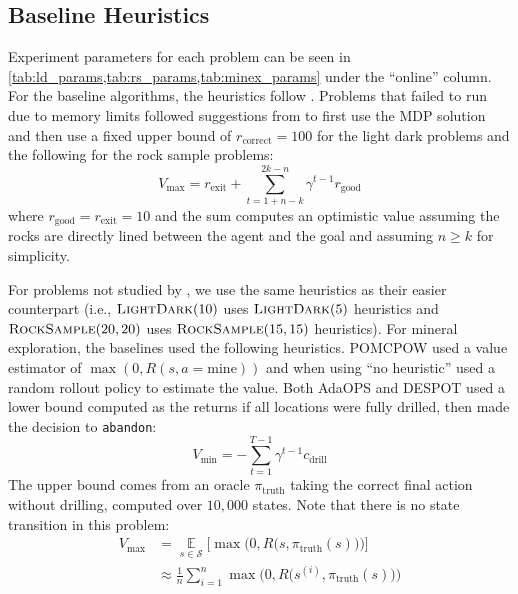 \subsection{Baseline Heuristics}

Experiment parameters for each problem can be seen in \cref{tab:ld_params,tab:rs_params,tab:minex_params} under the ``online'' column.
For the baseline algorithms, the heuristics follow \textcite{wu2021adaptive}.
Problems that failed to run due to memory limits followed suggestions from \textcite{adaops2021review} to first use the MDP solution and then use a fixed upper bound of $r_\text{correct}=100$ for the light dark problems and the following for the rock sample problems:
\begin{equation}
    V_\text{max} =  r_\text{exit} + \sum_{t=1+n-k}^{2k-n} \gamma^{t-1}r_\text{good}
\end{equation}
where $r_\text{good} = r_\text{exit} = 10$ and the sum computes an optimistic value assuming the rocks are directly lined between the agent and the goal and assuming $n \ge k$ for simplicity.

For problems not studied by \textcite{wu2021adaptive}, we use the same heuristics as their easier counterpart (i.e., $\textsc{LightDark}(10)$ uses $\textsc{LightDark}(5)$ heuristics and $\textsc{RockSample}(20,20)$ uses $\textsc{RockSample}(15,15)$ heuristics).
For mineral exploration, the baselines used the following heuristics.
POMCPOW used a value estimator of $\max(0, R(s, a=\text{mine}))$ and when using ``no heuristic'' used a random rollout policy to estimate the value.
Both AdaOPS and DESPOT used a lower bound computed as the returns if all locations were fully drilled, then made the decision to \texttt{abandon}:
\begin{equation}
    V_\text{min} = -\sum_{t=1}^{T-1} \gamma^{t-1}c_\text{drill}
\end{equation}
The upper bound comes from an oracle $\pi_\text{truth}$ taking the correct final action without drilling, computed over $10{,}000$ states. Note that there is no state transition in this problem:
\begin{align}
    V_\text{max} &= \operatorname*{\mathbb{E}}_{s \in \mathcal{S}} \bigg[ \max\Big(0, R\big(s, \pi_\text{truth}(s)\big)\Big) \bigg] \\
                 &\approx \frac{1}{n}\sum_{i=1}^n \max\Big(0, R\big(s^{(i)}, \pi_\text{truth}(s)\big)\Big)
\end{align}


